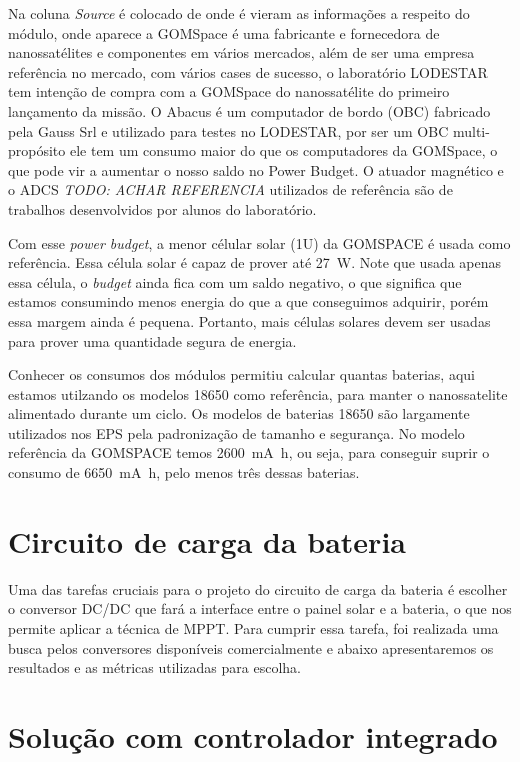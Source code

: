 Na coluna \textit{Source} é colocado de onde é vieram as informações a respeito do módulo, onde aparece a GOMSpace é uma fabricante e fornecedora de nanossatélites e componentes em vários mercados, além de ser uma empresa referência no mercado, com vários cases de sucesso, o laboratório LODESTAR tem intenção de compra com a GOMSpace do nanossatélite do primeiro lançamento da missão. O Abacus é um computador de bordo (OBC) fabricado pela Gauss Srl e utilizado para testes no LODESTAR, por ser um OBC multi-propósito ele tem um consumo maior do que os computadores da GOMSpace, o que pode vir a aumentar o nosso saldo no Power Budget. O atuador magnético \cite{unb_mag_actuator} e o ADCS \textit{TODO: ACHAR REFERENCIA} utilizados de referência são de trabalhos desenvolvidos por alunos do laboratório. 


Com esse \textit{power budget}, a menor célular solar (1U) da GOMSPACE é usada como referência. Essa célula solar é capaz de prover até \SI{27}{\watt}. Note que usada apenas essa célula, o \textit{budget} ainda fica com um saldo negativo, o que significa que estamos consumindo menos energia do que a que conseguimos adquirir, porém essa margem ainda é pequena. Portanto, mais células solares devem ser usadas para prover uma quantidade segura de energia.

Conhecer os consumos dos módulos permitiu calcular quantas baterias, aqui estamos utilzando os modelos 18650 como referência, para manter o nanossatelite alimentado durante um ciclo. Os modelos de baterias 18650 são largamente utilizados nos EPS pela padronização de tamanho e segurança. No modelo referência da GOMSPACE temos \SI{2600}{\milli\ampere\hour}, ou seja, para conseguir suprir o consumo de \SI{6650}{\milli\ampere\hour}, pelo menos três dessas baterias.

\section{Circuito de carga da bateria}

Uma das tarefas cruciais para o projeto do circuito de carga da bateria é escolher o conversor DC/DC que fará a interface entre o painel solar e a bateria, o que nos permite aplicar a técnica de MPPT. Para cumprir essa tarefa, foi realizada uma busca pelos conversores disponíveis comercialmente e abaixo apresentaremos os resultados e as métricas utilizadas para escolha.




\section{Solução com controlador integrado}

